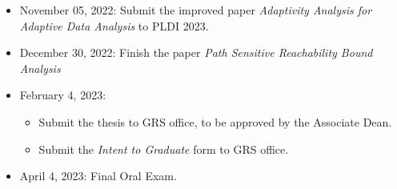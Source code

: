 \begin{itemize}
    \item November 05, 2022: Submit the improved paper \emph{Adaptivity Analysis for Adaptive Data Analysis} to PLDI 2023.
    \item December 30, 2022: Finish the paper \emph{Path Sensitive Reachability Bound Analysis}
    \item February 4, 2023: 
    \begin{itemize}
        \item Submit the thesis to GRS office, to be approved by the Associate Dean.
        \item Submit the \emph{Intent to Graduate} form to GRS office.
    \end{itemize} 
    \item April 4, 2023: Final Oral Exam. 
\end{itemize}